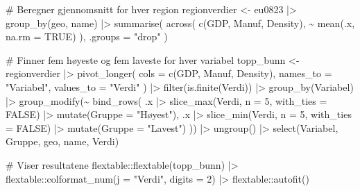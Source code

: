 \documentclass[
  letterpaper,
  DIV=11,
  numbers=noendperiod]{scrartcl}
\newenvironment{Shaded}{\begin{snugshade}}{\end{snugshade}}
\newcommand{\AttributeTok}[1]{\textcolor[rgb]{0.40,0.45,0.13}{#1}}
\newcommand{\CommentTok}[1]{\textcolor[rgb]{0.37,0.37,0.37}{#1}}
\newcommand{\ConstantTok}[1]{\textcolor[rgb]{0.56,0.35,0.01}{#1}}
\newcommand{\DecValTok}[1]{\textcolor[rgb]{0.68,0.00,0.00}{#1}}
\newcommand{\FunctionTok}[1]{\textcolor[rgb]{0.28,0.35,0.67}{#1}}
\newcommand{\NormalTok}[1]{\textcolor[rgb]{0.00,0.23,0.31}{#1}}
\newcommand{\OtherTok}[1]{\textcolor[rgb]{0.00,0.23,0.31}{#1}}
\newcommand{\SpecialCharTok}[1]{\textcolor[rgb]{0.37,0.37,0.37}{#1}}
\newcommand{\StringTok}[1]{\textcolor[rgb]{0.13,0.47,0.30}{#1}}
\begin{document}
\begin{Shaded}
\begin{Highlighting}[]
\CommentTok{\# Beregner gjennomsnitt for hver region}
\NormalTok{regionverdier }\OtherTok{\textless{}{-}}\NormalTok{ eu0823 }\SpecialCharTok{|\textgreater{}}
  \FunctionTok{group\_by}\NormalTok{(geo, name) }\SpecialCharTok{|\textgreater{}}
  \FunctionTok{summarise}\NormalTok{(}
    \FunctionTok{across}\NormalTok{(}
      \FunctionTok{c}\NormalTok{(GDP, Manuf, Density),}
      \SpecialCharTok{\textasciitilde{}} \FunctionTok{mean}\NormalTok{(.x, }\AttributeTok{na.rm =} \ConstantTok{TRUE}\NormalTok{)}
\NormalTok{    ),}
    \AttributeTok{.groups =} \StringTok{"drop"}
\NormalTok{  )}

\CommentTok{\# Finner fem høyeste og fem laveste for hver variabel}
\NormalTok{topp\_bunn }\OtherTok{\textless{}{-}}\NormalTok{ regionverdier }\SpecialCharTok{|\textgreater{}}
  \FunctionTok{pivot\_longer}\NormalTok{(}
    \AttributeTok{cols =} \FunctionTok{c}\NormalTok{(GDP, Manuf, Density),}
    \AttributeTok{names\_to =} \StringTok{"Variabel"}\NormalTok{,}
    \AttributeTok{values\_to =} \StringTok{"Verdi"}
\NormalTok{  ) }\SpecialCharTok{|\textgreater{}}
  \FunctionTok{filter}\NormalTok{(}\FunctionTok{is.finite}\NormalTok{(Verdi)) }\SpecialCharTok{|\textgreater{}}
  \FunctionTok{group\_by}\NormalTok{(Variabel) }\SpecialCharTok{|\textgreater{}}
  \FunctionTok{group\_modify}\NormalTok{(}\SpecialCharTok{\textasciitilde{}} \FunctionTok{bind\_rows}\NormalTok{(}
\NormalTok{    .x }\SpecialCharTok{|\textgreater{}}
      \FunctionTok{slice\_max}\NormalTok{(Verdi, }\AttributeTok{n =} \DecValTok{5}\NormalTok{, }\AttributeTok{with\_ties =} \ConstantTok{FALSE}\NormalTok{) }\SpecialCharTok{|\textgreater{}}
      \FunctionTok{mutate}\NormalTok{(}\AttributeTok{Gruppe =} \StringTok{"Høyest"}\NormalTok{),}
\NormalTok{    .x }\SpecialCharTok{|\textgreater{}}
      \FunctionTok{slice\_min}\NormalTok{(Verdi, }\AttributeTok{n =} \DecValTok{5}\NormalTok{, }\AttributeTok{with\_ties =} \ConstantTok{FALSE}\NormalTok{) }\SpecialCharTok{|\textgreater{}}
      \FunctionTok{mutate}\NormalTok{(}\AttributeTok{Gruppe =} \StringTok{"Lavest"}\NormalTok{)}
\NormalTok{  )) }\SpecialCharTok{|\textgreater{}}
  \FunctionTok{ungroup}\NormalTok{() }\SpecialCharTok{|\textgreater{}}
  \FunctionTok{select}\NormalTok{(Variabel, Gruppe, geo, name, Verdi)}

\CommentTok{\# Viser resultatene}
\NormalTok{flextable}\SpecialCharTok{::}\FunctionTok{flextable}\NormalTok{(topp\_bunn) }\SpecialCharTok{|\textgreater{}}
\NormalTok{  flextable}\SpecialCharTok{::}\FunctionTok{colformat\_num}\NormalTok{(}\AttributeTok{j =} \StringTok{"Verdi"}\NormalTok{, }\AttributeTok{digits =} \DecValTok{2}\NormalTok{) }\SpecialCharTok{|\textgreater{}}
\NormalTok{  flextable}\SpecialCharTok{::}\FunctionTok{autofit}\NormalTok{()}
\end{Highlighting}
\end{Shaded}
\end{document}
